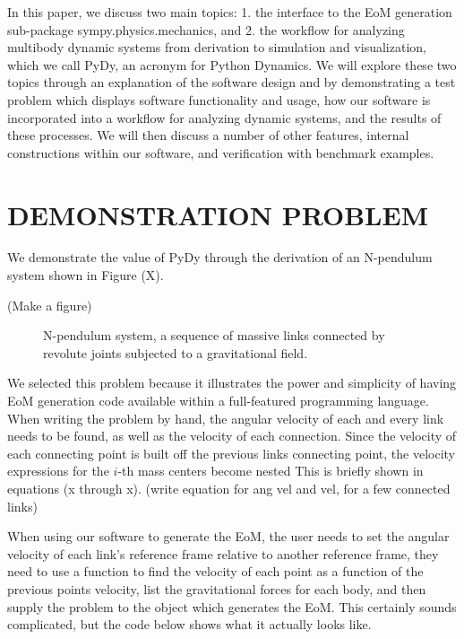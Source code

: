 \documentclass[twocolumn,10pt]{asme2e}
\begin{document}
In this paper, we discuss two main topics: 1. the interface to the EoM
generation sub-package sympy.physics.mechanics, and 2. the workflow for
analyzing multibody dynamic systems from derivation to simulation and
visualization, which we call PyDy, an acronym for Python Dynamics. We will
explore these two topics through an explanation of the software design and by
demonstrating a test problem which displays software functionality and usage,
how our software is incorporated into a workflow for analyzing dynamic systems,
and the results of these processes. We will then discuss a number of other
features, internal constructions within our software, and verification with
benchmark examples.
\section*{DEMONSTRATION PROBLEM}
We demonstrate the value of PyDy through the derivation of an N-pendulum system
shown in Figure (X).

(Make a figure)
\begin{figure*}

\caption{N-pendulum system, a sequence of massive links connected by revolute
joints subjected to a gravitational field.}
\end{figure*}

We selected this problem because it illustrates the power and simplicity of
having EoM generation code available within a full-featured programming
language.  When writing the problem by hand, the angular velocity of each and every link
needs to be found, as well as the velocity of each connection.
Since the velocity of each connecting point is built off the previous links
connecting point, the velocity expressions for the $i$-th mass centers become nested
This is briefly shown in equations (x through x).
(write equation for ang vel and vel, for a few connected links)

When using our software to generate the EoM, the user needs to set the angular
velocity of each link’s reference frame relative to another reference frame,
they need to use a function to find the velocity of each point as a function of
the previous points velocity, list the gravitational forces for each body, and
then supply the problem to the object which generates the EoM.
This certainly sounds complicated, but the code below shows what it actually
looks like.

\begin{figure*}
\end{figure*}
\end{document}

